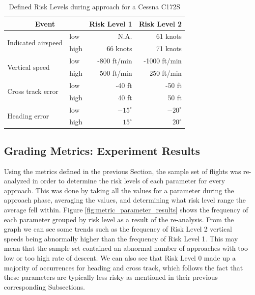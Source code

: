         \begin{table}
            \centering
            \caption{\small{Defined Risk Levels during approach for a Cessna C172S}} \label{tab:metrics_values}
            \vspace{3pt}
            \begin{tabular}{@{} l l | r r @{}}
                \hline
                \multicolumn{2}{c|}{\bfseries Event} & \bfseries Risk Level 1 & \bfseries Risk Level 2 \\
                \hline
                
                \multirow{2}{*}{Indicated airspeed} & low  & N.A.     & 61 knots \\
                                                    & high & 66 knots & 71 knots \\ 
                \hline
                \multirow{2}{*}{Vertical speed} & low  & -800 ft/min & -1000 ft/min \\
                                                & high & -500 ft/min & -250 ft/min \\
                \hline
                \multirow{2}{*}{Cross track error} & low  & -40 ft & -50 ft \\
                                                   & high & 40 ft  & 50 ft \\
                \hline
                \multirow{2}{*}{Heading error} & low  & $-15^\circ$ & $-20^\circ$ \\
                                               & high & $15^\circ$  & $20^\circ$ \\
                \hline
            \end{tabular}
        \end{table}
            

\subsection{Grading Metrics:  Experiment Results}
	
	Using the metrics defined in the previous Section, the sample set of flights was re-analyzed in order to determine the risk levels of each parameter for every approach.  This was done by taking all the values for a parameter during the approach phase, averaging the values, and determining what risk level range the average fell within.  Figure \ref{fig:metric_parameter_results} shows the frequency of each parameter grouped by risk level as a result of the re-analysis.  From the graph we can see some trends such as the frequency of Risk Level 2 vertical speeds being abnormally higher than the frequency of Risk Level 1.  This may mean that the sample set contained an abnormal number of approaches with too low or too high rate of descent.  We can also see that Risk Level 0 made up a majority of occurrences for heading and cross track, which follows the fact that these parameters are typically less risky as mentioned in their previous corresponding Subsections.
	
